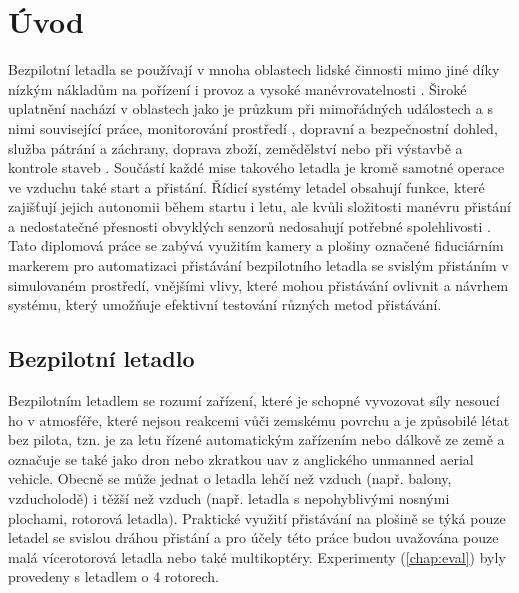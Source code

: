 \chapter{Úvod} \label{chap:introduction}




Bezpilotní letadla se používají v mnoha oblastech lidské činnosti mimo jiné díky nízkým nákladům na pořízení i provoz a vysoké manévrovatelnosti \cite{Hayat2016}. Široké uplatnění nachází v oblastech jako je průzkum při mimořádných událostech a s nimi související práce, monitorování prostředí \cite{Xin2022}, dopravní a bezpečnostní dohled, služba pátrání a záchrany, doprava zboží, zemědělství nebo při výstavbě a kontrole staveb \cite{Shakhatreh2019}. Součástí každé mise takového letadla je kromě samotné operace ve vzduchu také start a přistání. Řídicí systémy letadel obsahují funkce, které zajišťují jejich autonomii během startu i letu, ale kvůli složitosti manévru přistání a nedostatečné přesnosti obvyklých senzorů nedosahují potřebné spolehlivosti \cite{icuas}. Tato diplomová práce se zabývá využitím kamery a plošiny označené fiduciárním markerem pro automatizaci přistávání bezpilotního letadla se svislým přistáním v simulovaném prostředí, vnějšími vlivy, které mohou přistávání ovlivnit a návrhem systému, který umožňuje efektivní testování různých metod přistávání.

\section{Bezpilotní letadlo}
Bezpilotním letadlem se rozumí zařízení, které je schopné vyvozovat síly nesoucí ho v atmosféře, které nejsou reakcemi vůči zemskému povrchu a je způsobilé létat bez pilota, tzn. je za letu řízené automatickým zařízením nebo dálkově ze země a označuje se také jako dron nebo zkratkou \acrshort{uav} z anglického unmanned aerial vehicle. Obecně se může jednat o letadla lehčí než vzduch (např. balony, vzducholodě) i těžší než vzduch (např. letadla s nepohyblivými nosnými plochami, rotorová letadla). \cite{csn310001} Praktické využití přistávání na plošině se týká pouze letadel se svislou dráhou přistání a pro účely této práce budou uvažována pouze malá vícerotorová letadla nebo také multikoptéry. Experimenty (\cref{chap:eval}) byly provedeny s letadlem o 4 rotorech.

